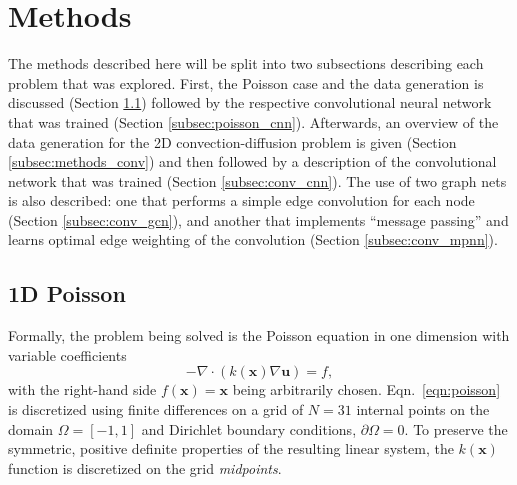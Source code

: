 \documentclass{siamart190516}
\renewcommand{\vec}[1]{\bm{{#1}}}
\newcommand{\grad}{\nabla}
\begin{document}
\section{Methods}\label{sec:methods}

The methods described here will be split into two subsections describing each problem that was explored. First, the Poisson case and the data generation is discussed (Section \ref{subsec:methods_poisson}) followed by the respective convolutional neural network that was trained (Section \ref{subsec:poisson_cnn}).  Afterwards, an overview of the data generation for the 2D convection-diffusion problem is given (Section \ref{subsec:methods_conv}) and then followed by a description of the convolutional network that was trained (Section \ref{subsec:conv_cnn}).  The use of two graph nets is also described: one that performs a simple edge convolution for each node (Section \ref{subsec:conv_gcn}), and another that implements ``message passing'' and learns optimal edge weighting of the convolution (Section \ref{subsec:conv_mpnn}).

\subsection{1D Poisson}\label{subsec:methods_poisson}

Formally, the problem being solved is the Poisson equation in one dimension with variable coefficients
%
\begin{equation} \label{eqn:poisson}
  -\grad \cdot \left(k\left(\vec{x}\right) \grad\vec{u}\right) = f,
\end{equation}
%
with the right-hand side $f\left(\vec{x}\right)=\vec{x}$ being arbitrarily chosen.  Eqn.~\eqref{eqn:poisson} is discretized using finite differences on a grid of $N=31$ internal points on the domain $\Omega = \left[-1, 1\right]$ and Dirichlet boundary conditions, $\partial\Omega = 0$.  To preserve the symmetric, positive definite properties of the resulting linear system, the $k\left(\vec{x}\right)$ function is discretized on the grid \textit{midpoints}\cite{numpde}.
\end{document}
